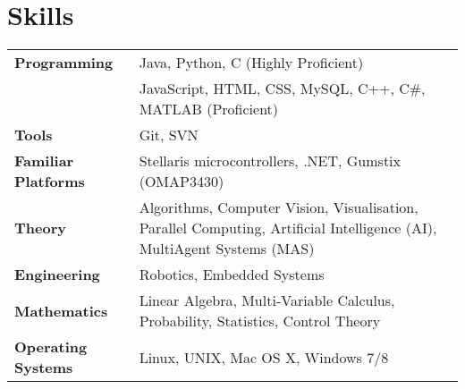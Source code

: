 \documentclass[10pt, a4paper]{report}
\newcommand{\teaching}[1]{}
\newcommand{\engineering}[1]{}
\renewcommand{\teaching}[1]{#1}
\renewcommand{\engineering}[1]{#1}
\newcommand{\sk}[3]{\subsubsection*{#1} {#2}{#3}}
\begin{document}
\section*{Skills}
\begin{tabular}{lp{14cm}}
{\bf Programming} &  Java, Python, C (Highly Proficient) \\  \addlinespace
{\bf } &  JavaScript, HTML, CSS, MySQL, C{\footnotesize ++}, C{\footnotesize \#}, MATLAB (Proficient) \\  \addlinespace
{\bf Tools} & Git, SVN\\  \addlinespace
{\bf Familiar Platforms} & Stellaris microcontrollers, .NET, Gumstix (OMAP3430) \\ \addlinespace
{\bf Theory} & Algorithms, Computer Vision, Visualisation, Parallel Computing, Artificial Intelligence (AI), Multi\-Agent Systems (MAS) \\  \addlinespace
{\bf Engineering} & Robotics, Embedded Systems \\  \addlinespace
{\bf Mathematics} & Linear Algebra,  Multi-Variable Calculus, Probability, Statistics, Control Theory \\  \addlinespace
{\bf Operating Systems} &  Linux, UNIX, Mac OS X, Windows 7/8
\end{tabular}
\end{document}
